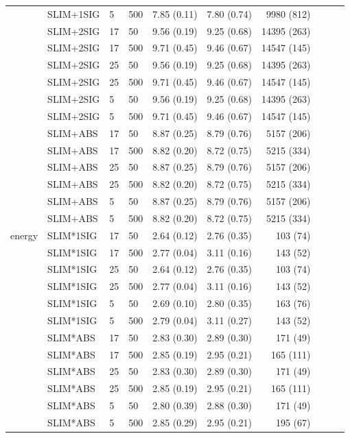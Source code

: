 \begin{longtable}{llllrrrrrr}
 & SLIM+1SIG & 5 & 500 & 7.85 (0.11) & 7.80 (0.74) & 9980 (812) \\
 & SLIM+2SIG & 17 & 50 & 9.56 (0.19) & 9.25 (0.68) & 14395 (263) \\
 & SLIM+2SIG & 17 & 500 & 9.71 (0.45) & 9.46 (0.67) & 14547 (145) \\
 & SLIM+2SIG & 25 & 50 & 9.56 (0.19) & 9.25 (0.68) & 14395 (263) \\
 & SLIM+2SIG & 25 & 500 & 9.71 (0.45) & 9.46 (0.67) & 14547 (145) \\
 & SLIM+2SIG & 5 & 50 & 9.56 (0.19) & 9.25 (0.68) & 14395 (263) \\
 & SLIM+2SIG & 5 & 500 & 9.71 (0.45) & 9.46 (0.67) & 14547 (145) \\
 & SLIM+ABS & 17 & 50 & 8.87 (0.25) & 8.79 (0.76) & 5157 (206) \\
 & SLIM+ABS & 17 & 500 & 8.82 (0.20) & 8.72 (0.75) & 5215 (334) \\
 & SLIM+ABS & 25 & 50 & 8.87 (0.25) & 8.79 (0.76) & 5157 (206) \\
 & SLIM+ABS & 25 & 500 & 8.82 (0.20) & 8.72 (0.75) & 5215 (334) \\
 & SLIM+ABS & 5 & 50 & 8.87 (0.25) & 8.79 (0.76) & 5157 (206) \\
 & SLIM+ABS & 5 & 500 & 8.82 (0.20) & 8.72 (0.75) & 5215 (334) \\
\midrule
energy & SLIM*1SIG & 17 & 50 & 2.64 (0.12) & 2.76 (0.35) & 103 (74) \\
 & SLIM*1SIG & 17 & 500 & 2.77 (0.04) & 3.11 (0.16) & 143 (52) \\
 & SLIM*1SIG & 25 & 50 & 2.64 (0.12) & 2.76 (0.35) & 103 (74) \\
 & SLIM*1SIG & 25 & 500 & 2.77 (0.04) & 3.11 (0.16) & 143 (52) \\
 & SLIM*1SIG & 5 & 50 & 2.69 (0.10) & 2.80 (0.35) & 163 (76) \\
 & SLIM*1SIG & 5 & 500 & 2.79 (0.04) & 3.11 (0.27) & 143 (52) \\
 & SLIM*ABS & 17 & 50 & 2.83 (0.30) & 2.89 (0.30) & 171 (49) \\
 & SLIM*ABS & 17 & 500 & 2.85 (0.19) & 2.95 (0.21) & 165 (111) \\
 & SLIM*ABS & 25 & 50 & 2.83 (0.30) & 2.89 (0.30) & 171 (49) \\
 & SLIM*ABS & 25 & 500 & 2.85 (0.19) & 2.95 (0.21) & 165 (111) \\
 & SLIM*ABS & 5 & 50 & 2.80 (0.39) & 2.88 (0.30) & 171 (49) \\
 & SLIM*ABS & 5 & 500 & 2.85 (0.29) & 2.95 (0.21) & 195 (67) \\

\end{longtable}
